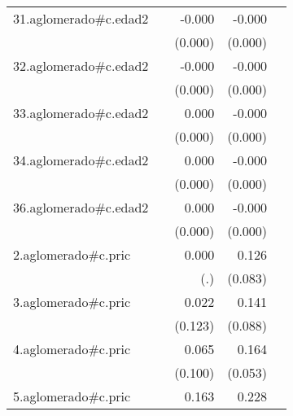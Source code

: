 {\begin{longtable}{l*{4}{D{.}{.}{-1}}}
\addlinespace
31.aglomerado#c.edad2&                     &      -0.000         &      -0.000\sym{***}&                     \\
            &                     &     (0.000)         &     (0.000)         &                     \\
\addlinespace
32.aglomerado#c.edad2&                     &      -0.000         &      -0.000\sym{***}&                     \\
            &                     &     (0.000)         &     (0.000)         &                     \\
\addlinespace
33.aglomerado#c.edad2&                     &       0.000         &      -0.000\sym{**} &                     \\
            &                     &     (0.000)         &     (0.000)         &                     \\
\addlinespace
34.aglomerado#c.edad2&                     &       0.000         &      -0.000\sym{*}  &                     \\
            &                     &     (0.000)         &     (0.000)         &                     \\
\addlinespace
36.aglomerado#c.edad2&                     &       0.000         &      -0.000         &                     \\
            &                     &     (0.000)         &     (0.000)         &                     \\
\addlinespace
2.aglomerado#c.pric&                     &       0.000         &       0.126         &                     \\
            &                     &         (.)         &     (0.083)         &                     \\
\addlinespace
3.aglomerado#c.pric&                     &       0.022         &       0.141         &                     \\
            &                     &     (0.123)         &     (0.088)         &                     \\
\addlinespace
4.aglomerado#c.pric&                     &       0.065         &       0.164\sym{**} &                     \\
            &                     &     (0.100)         &     (0.053)         &                     \\
\addlinespace
5.aglomerado#c.pric&                     &       0.163         &       0.228\sym{***}&                     \\

\end{longtable}}
